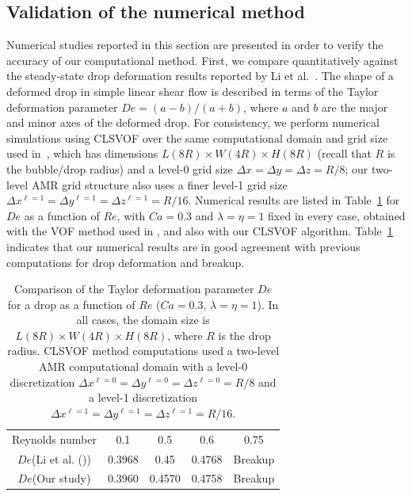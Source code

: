 \documentclass[%
 reprint,
 showkeys,
 amsmath,amssymb,
 aps,
 prfluids,
 onecolumn
]{revtex4-2}
\newcommand{\lwh}[3]{L(#1R)\times W(#2R) \times H(#3R)}
\begin{document}
\subsection{Validation of the numerical method}
Numerical studies reported in this section
are presented in order to verify the accuracy of our computational
method.  First, we compare quantitatively against the steady-state drop
deformation results reported by Li et al.~\cite{LiRenRen00}.  The shape of a
deformed drop in simple linear shear flow is described in terms of the Taylor
deformation parameter $De=(a-b)/(a+b)$, where $a$ and $b$ are the major and
minor axes of the deformed drop.  For consistency, we perform numerical
simulations using CLSVOF over the same computational domain and grid size used
in~\cite{LiRenRen00}, which has dimensions $\lwh{8}{4}{8}$ (recall that $R$ is
the bubble/drop radius) and a level-0 grid size $\Delta x=\Delta y=\Delta
z=R/8$; our two-level AMR grid structure also uses a finer level-1 grid size
$\Delta x^{\ell=1} = \Delta y^{\ell=1} = \Delta z^{\ell=1} = R/16$.  Numerical
results are listed in Table~\ref{tab:DeComparison} for $De$ as a function of
$Re$, with $Ca=0.3$ and $\lambda = \eta = 1$ fixed in every case, obtained with
the VOF method used in \cite{LiRenRen00}, and also with our CLSVOF algorithm.
Table~\ref{tab:DeComparison} indicates that our numerical results are in good
agreement with previous computations for drop deformation and breakup.
%
\begin{table}[tbh]
\caption{Comparison of the Taylor deformation parameter $De$ for a drop as a function 
         of $Re$ ($Ca=0.3$, $\lambda = \eta = 1$). In all cases, the domain 
         size is $\lwh{8}{4}{8}$, where $R$ is the drop radius.
         CLSVOF method computations used a two-level AMR computational domain 
         with a level-0 discretization $\Delta x^{\ell=0} = \Delta y^{\ell=0} 
         = \Delta z^{\ell=0} = R/8$ and a level-1 discretization
         $\Delta x^{\ell=1} = \Delta y^{\ell=1} = \Delta z^{\ell=1} = R/16$.}
\label{tab:DeComparison}
\center
\begin{tabular}{ c  c  c  c  c }
\hline
\hline
Reynolds number                      & 0.1     & 0.5     & 0.6     & 0.75      \\
$De$(Li et al. (\cite{LiRenRen00}))  & 0.3968  & 0.45    & 0.4768  & Breakup   \\
$De$(Our study)                      & 0.3960  & 0.4570  & 0.4758  & Breakup   \\
\hline
\hline
\end{tabular}
\end{table}
\end{document}
